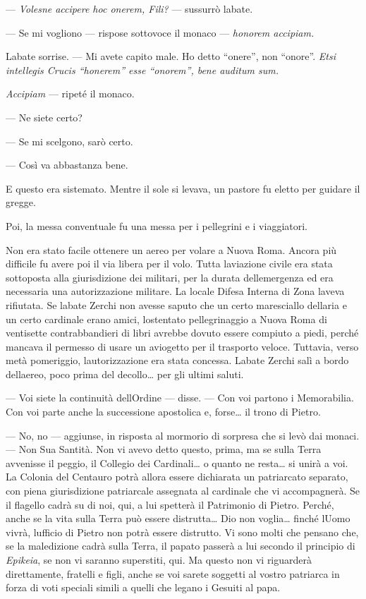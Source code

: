 --- \emph{Volesne accipere hoc onerem, Fili?} --- sussurrò
l\textquotesingle abate.

--- Se mi vogliono --- rispose sottovoce il monaco --- \emph{honorem
	accipiam.}

L\textquotesingle abate sorrise. --- Mi avete capito male. Ho detto
``onere'', non ``onore''. \emph{Etsi intellegis Crucis ``honerem'' esse
	``onorem'', bene auditum sum.}

\emph{Accipiam} --- ripeté il monaco.

--- Ne siete certo?

--- Se mi scelgono, sarò certo.

--- Così va abbastanza bene.

E questo era sistemato. Mentre il sole si levava, un pastore fu eletto
per guidare il gregge.

Poi, la messa conventuale fu una messa per i pellegrini e i viaggiatori.

Non era stato facile ottenere un aereo per volare a Nuova Roma. Ancora
più difficile fu avere poi il via libera per il volo. Tutta
l\textquotesingle aviazione civile era stata sottoposta alla
giurisdizione dei militari, per la durata dell\textquotesingle emergenza
ed era necessaria una autorizzazione militare. La locale Difesa Interna
di Zona l\textquotesingle aveva rifiutata. Se l\textquotesingle abate
Zerchi non avesse saputo che un certo maresciallo
dell\textquotesingle aria e un certo cardinale erano amici,
l\textquotesingle ostentato pellegrinaggio a Nuova Roma di ventisette
contrabbandieri di libri avrebbe dovuto essere compiuto a piedi, perché
mancava il permesso di usare un aviogetto per il trasporto veloce.
Tuttavia, verso metà pomeriggio, l\textquotesingle autorizzazione era
stata concessa. L\textquotesingle abate Zerchi salì a bordo
dell\textquotesingle aereo, poco prima del decollo\ldots{} per gli
ultimi saluti.

--- Voi siete la continuità dell\textquotesingle Ordine --- disse. ---
Con voi partono i Memorabilia. Con voi parte anche la successione
apostolica e, forse\ldots{} il trono di Pietro.

--- No, no --- aggiunse, in risposta al mormorio di sorpresa che si levò
dai monaci. --- Non Sua Santità. Non vi avevo detto questo, prima, ma se
sulla Terra avvenisse il peggio, il Collegio dei Cardinali\ldots{} o
quanto ne resta\ldots{} si unirà a voi. La Colonia del Centauro potrà
allora essere dichiarata un patriarcato separato, con piena
giurisdizione patriarcale assegnata al cardinale che vi accompagnerà. Se
il flagello cadrà su di noi, qui, a lui spetterà il Patrimonio di
Pietro. Perché, anche se la vita sulla Terra può essere
distrutta\ldots{} Dio non voglia\ldots{} finché l\textquotesingle Uomo
vivrà, l\textquotesingle ufficio di Pietro non potrà essere distrutto.
Vi sono molti che pensano che, se la maledizione cadrà sulla Terra, il
papato passerà a lui secondo il principio di \emph{Epikeia}, se non vi
saranno superstiti, qui. Ma questo non vi riguarderà direttamente,
fratelli e figli, anche se voi sarete soggetti al vostro patriarca in
forza di voti speciali simili a quelli che legano i Gesuiti al papa.

